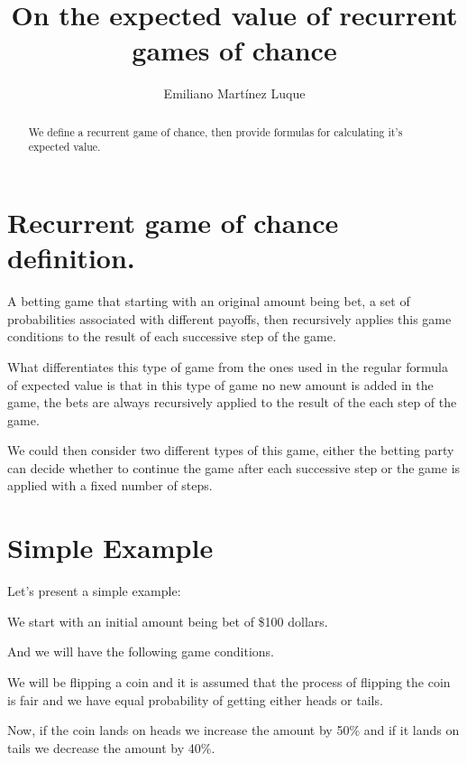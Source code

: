 \documentclass[12pt,reqno]{amsart}
\begin{document}
\title[On the expected value of recurrent games of chance]{On the expected value of recurrent games of chance}
\author{Emiliano Martínez Luque}
\maketitle

\begin{abstract}
We define a recurrent game of chance, then provide formulas for calculating it's expected value.
\end{abstract}

\section{Recurrent game of chance definition.}
\label{first section}


A betting game that starting with an original amount being bet, a set of probabilities associated with different payoffs, then recursively applies this game conditions to the result of each successive step of the game. 

What differentiates this type of game from the ones used in the regular formula of expected value is that in this type of game no new amount is added in the game, the bets are always recursively applied to the result of the each step of the game.

We could then consider two different types of this game, either the betting party can decide whether to continue the game after each successive step or the game is applied with a fixed number of steps.

\section{Simple Example}

Let's present a simple example:


We start with an initial amount being bet of \$100 dollars. 


And we will have the following game conditions.


We will be flipping a coin and it is assumed that the process of flipping the coin is fair and we have equal probability of getting either heads or tails.

Now, if the coin lands on heads we increase the amount by 50\% and if it lands on tails we decrease the amount by 40\%.
\end{document}
